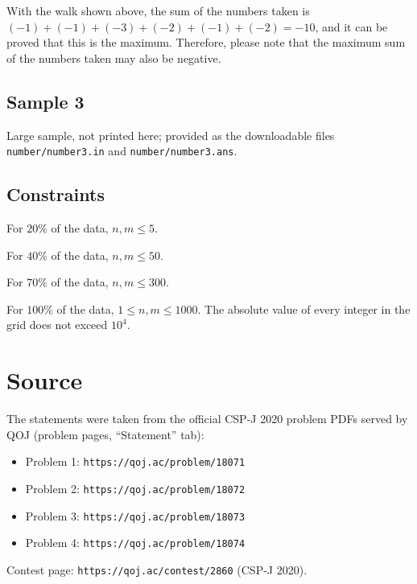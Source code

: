 \documentclass[11pt]{article}
\begin{document}
With the walk shown above, the sum of the numbers taken is
$(-1) + (-1) + (-3) + (-2) + (-1) + (-2) = -10$,
and it can be proved that this is the maximum.
Therefore, please note that the maximum sum of the numbers taken may also
be negative.

\subsection*{Sample 3}

Large sample, not printed here;
provided as the downloadable files \texttt{number/number3.in} and \texttt{number/number3.ans}.

\subsection*{Constraints}

For $20\%$ of the data, $n, m \le 5$.

For $40\%$ of the data, $n, m \le 50$.

For $70\%$ of the data, $n, m \le 300$.

For $100\%$ of the data, $1 \le n, m \le 1000$.
The absolute value of every integer in the grid does not exceed $10^4$.

\section*{Source}

The statements were taken from the official CSP-J 2020 problem PDFs served
by QOJ (problem pages, ``Statement'' tab):
\begin{itemize}
\item Problem 1: \texttt{https://qoj.ac/problem/18071}
\item Problem 2: \texttt{https://qoj.ac/problem/18072}
\item Problem 3: \texttt{https://qoj.ac/problem/18073}
\item Problem 4: \texttt{https://qoj.ac/problem/18074}
\end{itemize}
Contest page: \texttt{https://qoj.ac/contest/2860} (CSP-J 2020).
\end{document}

